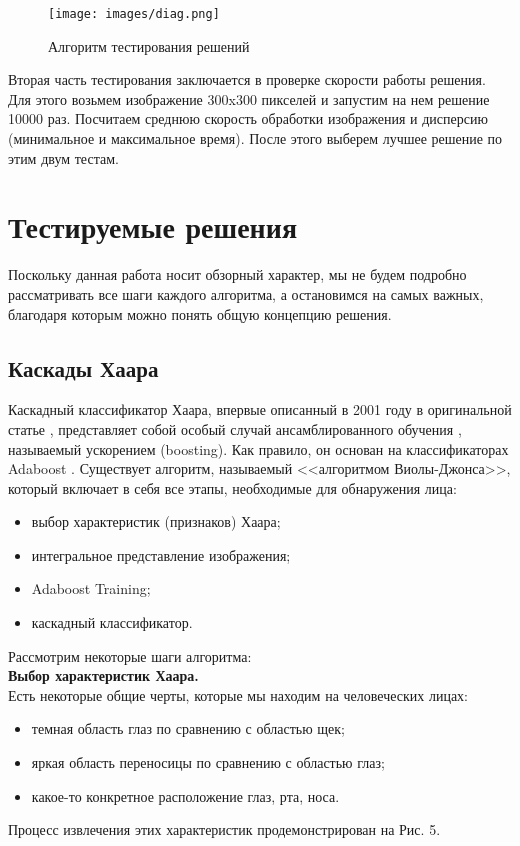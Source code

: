 \documentclass[14pt]{matmex-diploma-custom}
\begin{document}
  \begin{figure}[h]
            \centering
            \texttt{[image: images/diag.png]}
            \caption{Алгоритм тестирования решений}
    \end{figure}
    
    Вторая часть тестирования заключается в проверке скорости работы решения. Для этого возьмем изображение 300x300 пикселей и запустим на нем решение 10000 раз. Посчитаем среднюю скорость обработки изображения и дисперсию (минимальное и максимальное время). После этого выберем лучшее решение по этим двум тестам. 
 
\section{Тестируемые решения}

    Поскольку данная работа носит обзорный характер, мы не будем подробно рассматривать все шаги каждого алгоритма, а остановимся на самых важных, благодаря которым можно понять общую концепцию решения.
    \subsection{Каскады Хаара}
        Каскадный классификатор Хаара, впервые описанный в 2001 году в оригинальной статье  \cite{haar:cascade}, представляет собой особый случай ансамблированного обучения  \cite{wiki:ensemble}, называемый ускорением (boosting). Как правило, он основан на классификаторах Adaboost \cite{wiki:ada}.
        Существует алгоритм, называемый <<алгоритмом Виолы-Джонса>>, который включает в себя все этапы, необходимые для обнаружения лица:
        \begin{itemize}
            \item выбор характеристик (признаков) Хаара; 
            \item интегральное представление изображения;
            \item Adaboost Training;
            \item каскадный классификатор.
        \end{itemize}
        Рассмотрим некоторые шаги алгоритма: \\
    \textbf{Выбор характеристик Хаара.} \\ 
        Есть некоторые общие черты, которые мы находим на человеческих лицах:
        \begin{itemize}
            \item темная область глаз по сравнению с областью щек;
            \item яркая область переносицы по сравнению с областью глаз;
            \item какое-то конкретное расположение глаз, рта, носа.
        \end{itemize}
        Процесс извлечения этих характеристик продемонстрирован на Рис. 5.
    
\end{document}
